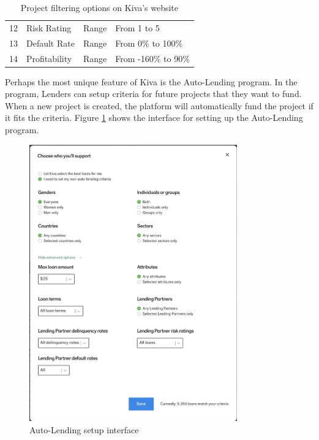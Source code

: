 \begin{table}[H]
{\begin{tabular}{|l|l|l|p{}|}
			12 & Risk Rating            & Range           & From 1 to 5                                                                                                             \\
			13 & Default Rate           & Range           & From 0\% to 100\%                                                                                                       \\
			14 & Profitability          & Range           & From -160\% to 90\%                                                                                                     \\
			\hline
		\end{tabular}%
	}
	\caption{Project filtering options on Kiva's website \parencite{kiva-browse}}
	\label{tab:browser-criteria}
\end{table}

Perhaps the most unique feature of Kiva is the Auto-Lending program.
In the program, Lenders can setup criteria for future projects that they want to fund.
When a new project is created, the platform will automatically fund the project if it fits the criteria.
Figure \ref{fig:auto-lend-setup} shows the interface for setting up the Auto-Lending program.

\begin{figure}[H]
	\centering
	\includegraphics[width=0.8\textwidth]{images/auto-lend-setup.png}
	\caption{Auto-Lending setup interface \parencite{kiva-autolend2}}
	\label{fig:auto-lend-setup}
\end{figure}

